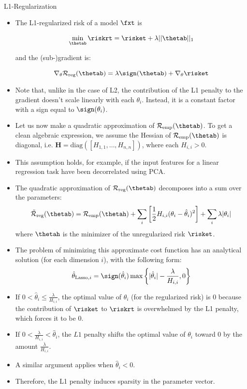\begin{vbframe} {L1-Regularization}
  

  \begin{itemize}
    \item The L1-regularized risk of a model $\fxt$ is

      \[
      \min_{\thetab} \riskrt = \risket + \lambda ||\thetab||_1
      \] 
      
      and the (sub-)gradient is:
      
      $$\nabla_{\theta} \mathcal{R}_{\text{reg}}(\thetab) = \lambda \sign(\thetab) + \nabla_{\theta} \risket$$

    \item Note that, unlike in the case of L2, the contribution of the L1 penalty to the gradient doesn't scale linearly with each $\theta_i$. Instead, it is a constant factor with a sign equal to $\sign(\theta_i)$.
    \item Let us now make a quadratic approximation of $\mathcal{R}_{\text{emp}}(\thetab)$. To get a clean algebraic expression, we assume the Hessian of $\mathcal{R}_{\text{emp}}(\thetab)$ is diagonal, i.e. $\bm{H} = \text{diag}([H_{1,1}, \ldots , H_{n,n}])$, where each $H_{i,i} > 0$.
    \item This assumption holds, for example, if the input features for a linear regression task have been decorrelated using PCA.
  \end{itemize}
  
  \framebreak
  
  \begin{itemize}
    \item The quadratic approximation of $\mathcal{R}_{\text{reg}}(\thetab)$ decomposes into a sum over the parameters:
  $$\mathcal{\tilde R}_{\text{reg}}(\thetab) = \mathcal{R}_{\text{emp}}(\thetah) + \sum_i \left[ \frac{1}{2} H_{i,i} (\theta_i - \hat{\theta}_i)^2 \right] + \sum_i \lambda |\theta_i|$$
  where $\thetah$ is the minimizer of the unregularized risk $\risket$.
    \item The problem of minimizing this approximate cost function has an analytical solution (for each dimension $i$), with the following form:
     $$\hat{\theta}_{\text{Lasso},i} = \sign(\hat{\theta}_i) \max \left\{ |\hat{\theta}_i| - \frac{\lambda}{H_{i,i}},0 \right\}$$
    \item If  $0 < \hat{\theta}_i \leq \frac{\lambda}{H_{i,i}}$, the optimal value of $\theta_i$ (for the regularized risk) is $0$ because the contribution of  $\risket$ to $\riskrt$ is overwhelmed by the L1 penalty, which forces it to be $0$.
    \item If $0 < \frac{\lambda}{H_{i,i}} < \hat{\theta}_i$, the $L1$ penalty shifts the optimal value of $\theta_i$ toward 0 by the amount $\frac{\lambda}{H_{i,i}}$.
    \item A similar argument applies when $\hat{\theta}_i < 0$. 
    \item Therefore, the L1 penalty induces sparsity in the parameter vector.
  \end{itemize}
\end{vbframe}


